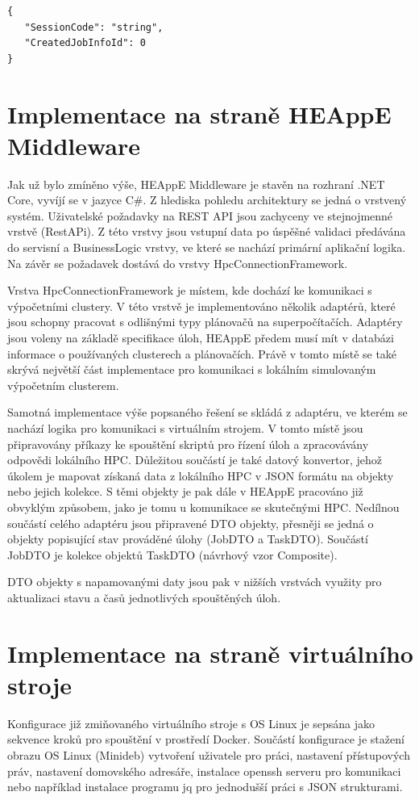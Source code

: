 \hfill \break
\begin{lstlisting}[caption={Příklad JSON struktury}]
{
   "SessionCode": "string",
   "CreatedJobInfoId": 0
}
\end{lstlisting}

\section{Implementace na straně HEAppE Middleware}
Jak už bylo zmíněno výše, HEAppE Middleware je stavěn na rozhraní .NET Core, vyvíjí se v jazyce C\#. Z hlediska pohledu architektury se jedná o vrstvený systém. Uživatelské požadavky na REST API jsou zachyceny ve stejnojmenné vrstvě (RestAPi). Z této vrstvy jsou vstupní data po úspěšné validaci předávána do servisní a BusinessLogic vrstvy, ve které se nachází primární aplikační logika. Na závěr se požadavek dostává do vrstvy HpcConnectionFramework.

Vrstva HpcConnectionFramework je místem, kde dochází ke komunikaci s výpočetními clustery. V této vrstvě je implementováno několik adaptérů, které jsou schopny pracovat s odlišnými typy plánovačů na superpočítačích. Adaptéry jsou voleny na základě specifikace úloh, HEAppE předem musí mít v databázi informace o používaných clusterech a plánovačích. Právě v tomto místě se také skrývá největší část implementace pro komunikaci s lokálním simulovaným výpočetním clusterem.

Samotná implementace výše popsaného řešení se skládá z adaptéru, ve kterém se nachází logika pro komunikaci s virtuálním strojem. V tomto místě jsou připravovány příkazy ke spouštění skriptů pro řízení úloh a zpracovávány odpovědi lokálního HPC. Důležitou součástí je také datový konvertor, jehož úkolem je mapovat získaná data z lokálního HPC v JSON formátu na objekty nebo jejich kolekce. S těmi objekty je pak dále v HEAppE pracováno již obvyklým způsobem, jako je tomu u komunikace se skutečnými HPC. Nedílnou součástí celého adaptéru jsou připravené DTO objekty, přesněji se jedná o objekty popisující stav prováděné úlohy (JobDTO a TaskDTO). Součástí JobDTO je kolekce objektů TaskDTO (návrhový vzor Composite).

DTO objekty s napamovanými daty jsou pak v nižších vrstvách využity pro aktualizaci stavu a časů jednotlivých spouštěných úloh.

\section{Implementace na straně virtuálního stroje}
Konfigurace již zmiňovaného virtuálního stroje s OS Linux je sepsána jako sekvence kroků pro spouštění v prostředí Docker. Součástí konfigurace je stažení obrazu OS Linux (Minideb) vytvoření uživatele pro práci, nastavení přístupových práv, nastavení domovského adresáře, instalace openssh serveru pro komunikaci nebo například instalace programu jq pro jednodušší práci s JSON strukturami.

